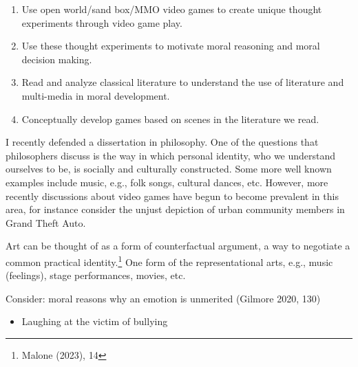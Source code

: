 \documentclass[
  letterpaper,
  DIV=11,
  numbers=noendperiod]{scrreprt}
\providecommand{\tightlist}{%
  \setlength{\itemsep}{0pt}\setlength{\parskip}{0pt}}\usepackage{longtable,booktabs,array}
\begin{document}
\begin{tcolorbox}[enhanced jigsaw, arc=.35mm, breakable, rightrule=.15mm, colback=white, colframe=quarto-callout-important-color-frame, bottomrule=.15mm, leftrule=.75mm, opacityback=0, toprule=.15mm, left=2mm]
\begin{tcolorbox}[enhanced jigsaw, arc=.35mm, breakable, rightrule=.15mm, colback=white, colframe=quarto-callout-tip-color-frame, bottomrule=.15mm, leftrule=.75mm, opacityback=0, toprule=.15mm, left=2mm]
\begin{enumerate}
\def\labelenumi{\arabic{enumi}.}
\tightlist
\item
  Use open world/sand box/MMO video games to create unique thought
  experiments through video game play.
\item
  Use these thought experiments to motivate moral reasoning and moral
  decision making.
\item
  Read and analyze classical literature to understand the use of
  literature and multi-media in moral development.
\item
  Conceptually develop games based on scenes in the literature we read.
\end{enumerate}

I recently defended a dissertation in philosophy. One of the questions
that philosophers discuss is the way in which personal identity, who we
understand ourselves to be, is socially and culturally constructed. Some
more well known examples include music, e.g., folk songs, cultural
dances, etc. However, more recently discussions about video games have
begun to become prevalent in this area, for instance consider the unjust
depiction of urban community members in Grand Theft Auto.

Art can be thought of as a form of counterfactual argument, a way to
negotiate a common practical identity.\footnote{Malone (2023), 14} One
form of the representational arts, e.g., music (feelings), stage
performances, movies, etc.

Consider: moral reasons why an emotion is unmerited (Gilmore 2020, 130)

\begin{itemize}
\tightlist
\item
  Laughing at the victim of bullying
\end{itemize}


\end{tcolorbox}
\end{tcolorbox}
\end{document}
